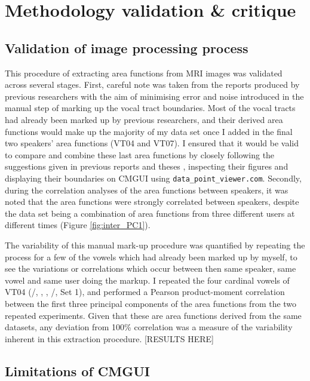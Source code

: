 \section{Methodology validation \& critique}\label{sec:methodology-validation}

\subsection{Validation of image processing process}

This procedure of extracting area functions from MRI images was validated across several stages. First, careful note was taken from the reports produced by previous researchers with the aim of minimising error and noise introduced in the manual step of marking up the vocal tract boundaries. Most of the vocal tracts had already been marked up by previous researchers, and their derived area functions would make up the majority of my data set once I added in the final two speakers' area functions (VT04 and VT07). I ensured that it would be valid to compare and combine these last area functions by closely following the suggestions given in previous reports and theses \cite{helen, daniel, kalyan}, inspecting their figures and displaying their boundaries on CMGUI using \verb|data_point_viewer.com|. Secondly, during the correlation analyses of the area functions between speakers, it was noted that the area functions were strongly correlated between speakers, despite the data set being a combination of area functions from three different users at different times (Figure \ref{fig:inter_PC1}).

The variability of this manual mark-up procedure was quantified by repeating the process for a few of the vowels which had already been marked up by myself, to see the variations or correlations which occur between then same speaker, same vowel and same user doing the markup. I repeated the four cardinal vowels of VT04 (/, \textipa{\ae}, , /, Set 1), and performed a Pearson product-moment correlation between the first three principal components of the area functions from the two repeated experiments. Given that these are area functions derived from the same datasets, any deviation from 100\% correlation was a measure of the variability inherent in this extraction procedure. [RESULTS HERE]

\subsection{Limitations of CMGUI}

